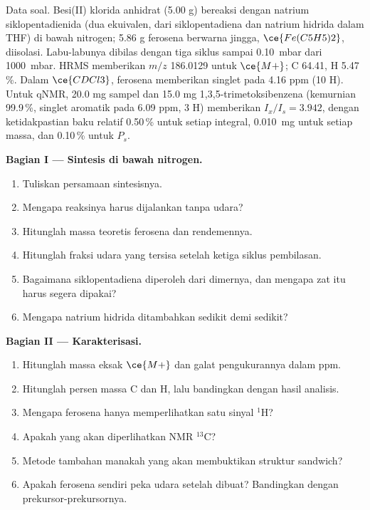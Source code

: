 \begin{problem}
\label{pb:b3:lab-techniques-3:1}
Data soal. Besi(II) klorida anhidrat (5.00 g) bereaksi dengan natrium
siklopentadienida (dua ekuivalen, dari siklopentadiena dan natrium hidrida dalam
THF) di bawah nitrogen; 5.86 g ferosena berwarna jingga, $\ce{Fe(C5H5)2}$, diisolasi. Labu-labunya
dibilas dengan tiga siklus sampai \qty{0.10}{mbar} dari \qty{1000}{mbar}. HRMS memberikan $m/z$ 186.0129 untuk $\ce{M+}$;  C 64.41, H 5.47\,\%. Dalam $\ce{CDCl3}$, ferosena memberikan singlet pada 4.16 ppm (10 H). Untuk qNMR,
20.0 mg sampel dan 15.0 mg 1,3,5-trimetoksibenzena (kemurnian 99.9\,\%, singlet aromatik
pada 6.09 ppm, 3 H) memberikan $I_x/I_s = 3.942$, dengan ketidakpastian baku relatif 0.50\,\% untuk setiap
integral, \qty{0.010}{mg} untuk setiap massa, dan 0.10\,\% untuk $P_s$.

\medskip\noindent\textbf{Bagian I --- Sintesis di bawah nitrogen.}
\begin{enumerate}[beginpenalty=10000]
  \item Tuliskan persamaan sintesisnya.
  \item Mengapa reaksinya harus dijalankan tanpa udara?
  \item Hitunglah massa teoretis ferosena dan rendemennya.
  \item Hitunglah fraksi udara yang tersisa setelah ketiga siklus pembilasan.
  \item Bagaimana siklopentadiena diperoleh dari dimernya, dan mengapa zat itu harus segera dipakai?
  \item Mengapa natrium hidrida ditambahkan sedikit demi sedikit?
\end{enumerate}

\medskip\noindent\textbf{Bagian II --- Karakterisasi.}
\begin{enumerate}[resume, beginpenalty=10000]
  \item Hitunglah massa eksak $\ce{M+}$ dan galat pengukurannya dalam ppm.
  \item Hitunglah persen massa C dan H, lalu bandingkan dengan hasil analisis.
  \item Mengapa ferosena hanya memperlihatkan satu sinyal $^1$H?
  \item Apakah yang akan diperlihatkan NMR $^{13}$C?
  \item Metode tambahan manakah yang akan membuktikan struktur sandwich?
  \item Apakah ferosena sendiri peka udara setelah dibuat? Bandingkan dengan prekursor-prekursornya.
\end{enumerate}


\end{problem}
